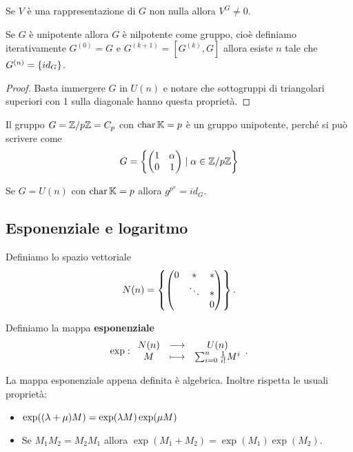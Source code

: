 \begin{corollary}\label{CorFissatoDaUnipotenteNonEBanale}
    Se $V$ \`e una rappresentazione di $G$ non nulla allora $V^G\neq 0$.
\end{corollary}

\begin{corollary}
    Se $G$ \`e unipotente allora $G$ \`e nilpotente come gruppo, cio\`e definiamo iterativamente $G^{(0)}=G$ e $G^{(k+1)}=[G^{(k)},G]$ allora esiste $n$ tale che $G^{(n)}=\left\{{id_G}\right\}$.
\end{corollary}
\begin{proof}
Basta immergere $G$ in $U(n)$ e notare che sottogruppi di triangolari superiori con 1 sulla diagonale hanno questa propriet\`a.
\end{proof}


\begin{example}
Il gruppo $G={\mathbb{Z}/{p}\mathbb{Z}}=C_p$ con $\operatorname{char} \mathbb{K}=p$ \`e un gruppo unipotente, perch\'e si pu\`o scrivere come
\[G=\left\{{\begin{pmatrix}1&\alpha\\0&1\end{pmatrix}\mid \alpha\in{\mathbb{Z}/{p}\mathbb{Z}}}\right\}\]
\end{example}
\begin{remark}
Se $G=U(n)$ con $\operatorname{char} \mathbb{K}=p$ allora $g^{p^n}=id_G$.
\end{remark}

\subsection{Esponenziale e logaritmo}

\begin{notation}
Definiamo lo spazio vettoriale
\[N(n)=\left\{{\begin{pmatrix}0&\ast&\ast\\&\ddots&\ast\\&&0\end{pmatrix}}\right\}.\]
\end{notation}

\begin{definition}[Esponenziale]
Definiamo la mappa \textbf{esponenziale}
\[\exp:\begin{array}{ccc} {N(n)} & \longrightarrow & {U(n)}\\ {M} & \longmapsto & {\sum_{i=0}^n\frac1{i!}M^i} \end{array}.\]
\end{definition}
\begin{remark}
La mappa esponenziale appena definita \`e algebrica. Inoltre rispetta le usuali propriet\`a:
\begin{itemize}
    \item $\exp((\lambda+\mu)M)=\exp(\lambda M)\exp(\mu M)$
    \item Se $M_1M_2=M_2M_1$ allora $\exp(M_1+M_2)=\exp(M_1)\exp(M_2)$.
\end{itemize}
\end{remark}

